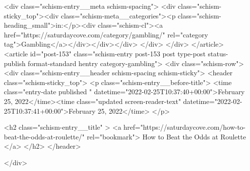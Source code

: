 {		<div class="schism-entry__meta schism-spacing">			<div class="schism-sticky_top"><div class="schism-meta__categories"><p class="schism-heading_small">in:</p><div class="schism-cl"><a href="https://saturdaycove.com/category/gambling/" rel="category tag">Gambling</a></div></div></div>		</div>
	</div>
</article>
<article id="post-153" class="schism-entry post-153 post type-post status-publish format-standard hentry category-gambling">
	<div class="schism-row">		<div class="schism-entry__header schism-spacing schism-sticky">			<header class="schism-sticky_top">				<p class="schism-entry__before-title">
					<time class="entry-date published " datetime="2022-02-25T10:37:40+00:00">February 25, 2022</time><time class="updated screen-reader-text" datetime="2022-02-25T10:37:41+00:00">February 25, 2022</time>				</p>

				<h2 class="schism-entry__title" >
					<a href="https://saturdaycove.com/how-to-beat-the-odds-at-roulette/" rel="bookmark">
						How to Beat the Odds at Roulette					</a>
				</h2>
			</header>

					</div>

}
